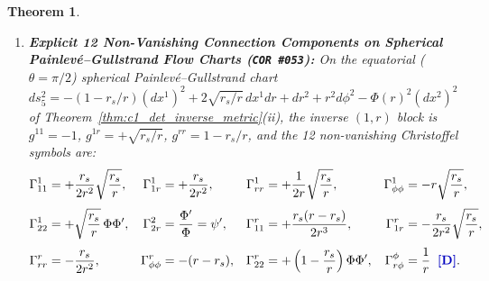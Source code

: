 \documentclass[11pt,a4paper]{article}
\newcommand{\catD}{\text{\textbf{\textcolor{blue!75!black}{[D]}}}}
\theoremstyle{definition}
\theoremstyle{plain}
\newtheorem{theorem}[axiom]{Theorem}
\theoremstyle{remark}
\begin{document}
\begin{theorem}
\begin{enumerate}[label=(\roman*)]
  Because $g_{\mu 2}^{\mathrm{proj}} \equiv 0$ implies $\Gamma^2_{\mu\nu} \equiv 0$ and $\Gamma^\lambda_{2\mu} \equiv 0$ in Eq.~\eqref{eq:c2_gamma_zeros}, the horizontal distribution $\mathcal{H}$ is Frobenius-integrable and O'Neill's integrability obstruction tensor vanishes identically ($\mathcal{A}_E F \equiv 0$). For the unit vertical tangent vector $U \equiv \Phi^{-1}\partial_2 \in \Gamma(\mathcal{V})$ ($g_{\mathrm{proj}}(U, U) = -1$) and any horizontal vector $X = X^\mu\partial_\mu \in \Gamma(\mathcal{H})$, O'Neill's second fundamental form tensor evaluates to:
  \begin{align}
  \mathcal{A}_E F &\equiv 0, \qquad
  \mathcal{T}_U X = \left(X^\mu\partial_\mu\psi\right) U, \nonumber \\[3pt]
  \mathcal{T}_U U &= \Phi^{-2}\,\Gamma^\mu_{22}\,\partial_\mu = g^{\mu\nu}\!\left(\partial_\nu\psi\right)\partial_\mu = +\nabla^{\mathcal{H}}\psi \;\;\catD. \label{eq:c2_oneill_umbilic}
  \end{align}
  \item \textbf{Explicit 12 Non-Vanishing Connection Components on Spherical Painlev\'e--Gullstrand Flow Charts (\texttt{COR~\#053}):}
  On the equatorial ($\theta = \pi/2$) spherical Painlev\'e--Gullstrand chart $ds_5^2 = -(1 - r_s/r)(dx^1)^2 + 2\sqrt{r_s/r}\,dx^1 dr + dr^2 + r^2 d\phi^2 - \Phi(r)^2(dx^2)^2$ of Theorem~\ref{thm:c1_det_inverse_metric}(ii), the inverse $(1,r)$ block is $g^{11} = -1$, $g^{1r} = +\sqrt{r_s/r}$, $g^{rr} = 1 - r_s/r$, and the 12 non-vanishing Christoffel symbols are:
  \begin{align}
  \Gamma^1_{11} &= +\frac{r_s}{2r^2}\sqrt{\frac{r_s}{r}}, &
  \Gamma^1_{1r} &= +\frac{r_s}{2r^2}, &
  \Gamma^1_{rr} &= +\frac{1}{2r}\sqrt{\frac{r_s}{r}}, &
  \Gamma^1_{\phi\phi} &= -r\sqrt{\frac{r_s}{r}}, \nonumber \\[3pt]
  \Gamma^1_{22} &= +\sqrt{\frac{r_s}{r}}\,\Phi\Phi', &
  \Gamma^2_{2r} &= \frac{\Phi'}{\Phi} = \psi', &
  \Gamma^r_{11} &= +\frac{r_s(r - r_s)}{2r^3}, &
  \Gamma^r_{1r} &= -\frac{r_s}{2r^2}\sqrt{\frac{r_s}{r}}, \nonumber \\[3pt]
  \Gamma^r_{rr} &= -\frac{r_s}{2r^2}, &
  \Gamma^r_{\phi\phi} &= -(r - r_s), &
  \Gamma^r_{22} &= +\left(1 - \frac{r_s}{r}\right)\Phi\Phi', &
  \Gamma^\phi_{r\phi} &= \frac{1}{r} \;\;\catD. \label{eq:c2_pg_12_christoffels}
  \end{align}
\end{enumerate}
\end{theorem}
\end{document}
